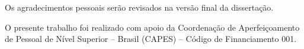 

Os agradecimentos pessoais serão revisados na versão final da dissertação.

O presente trabalho foi realizado com apoio da Coordenação de Aperfeiçoamento de Pessoal de Nível Superior -- Brasil (CAPES) -- Código de Financiamento 001.

%
